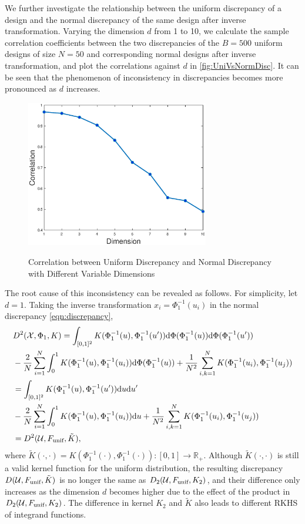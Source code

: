 \documentclass[graybox]{svmult}
\newcommand{\dif}{{\rm d}}
\newcommand{\Udes}{\mathcal{U}}
\newcommand{\Xdes}{\mathcal{X}}
\newcommand{\unif}{\textup{unif}}
\begin{document}
We further investigate the relationship between the uniform discrepancy of a design and the normal discrepancy of the same design after inverse transformation.
Varying the dimension $d$ from 1 to 10, we calculate the sample correlation coefficients between the two discrepancies of the $B=500$ uniform designs of size $N=50$ and corresponding normal designs after inverse transformation, and plot the correlations against $d$ in \ref{fig:UniVsNormDisc}. 
It can be seen that the phenomenon of inconsistency in discrepancies becomes more pronounced as $d$ increases.

\begin{figure}[ht]
\label{fig:DimVsDisc}
\centering
{\includegraphics[width=8cm]{dimVsdisc.eps}}
\caption{Correlation between Uniform Discrepancy and Normal Discrepancy with Different Variable Dimensions}
\end{figure}

The root cause of this inconsistency can be revealed as follows. 
For simplicity, let $d=1$. 
Taking the inverse transformation $x_{i}=\Phi^{-1}_1(u_{i})$ in the normal discrepancy \eqref{eqn:discrepancy}, 
\begin{align*}
&D^2(\Xdes, \Phi_1, K) = \int_{[0,1]^2} K(\Phi^{-1}_1(u),\Phi^{-1}_1(u'))\dif \Phi(\Phi^{-1}_1(u))\dif \Phi(\Phi^{-1}_1(u'))\\
&-\frac{2}{N}\sum_{i=1}^N \int_0^1 K(\Phi^{-1}_1(u),\Phi^{-1}_1(u_i))\dif \Phi(\Phi^{-1}_1(u))+\frac{1}{N^2}\sum_{i,k=1}^N K(\Phi^{-1}_1(u_i), \Phi^{-1}_1(u_j))\\
&=\int_{[0,1]^2} K(\Phi^{-1}_1(u),\Phi^{-1}_1(u'))\dif u\dif u'\\
&-\frac{2}{N}\sum_{i=1}^N \int_0^1 K(\Phi^{-1}_1(u),\Phi^{-1}_1(u_i))\dif u+\frac{1}{N^2}\sum_{i,k=1}^N K(\Phi^{-1}_1(u_i), \Phi^{-1}_1(u_j))\\
&=D^2(\Udes,F_\unif,\tilde{K}),
\end{align*}
where $\tilde{K}(\cdot,\cdot)=K(\Phi^{-1}_1(\cdot), \Phi^{-1}_1(\cdot)): [0, 1]\rightarrow \mathbb{R}_{+}$. 
Although $\tilde{K}(\cdot,\cdot)$ is still a valid kernel function for the uniform distribution, the resulting discrepancy $D(\Udes,F_\unif, \tilde{K})$ is no longer the same as $D_2(\Udes, F_\unif, K_2)$, and their difference only increases as the dimension $d$ becomes higher due to the effect of the product in $D_2(\Udes, F_\unif, K_2)$. 
The difference in kernel $K_2$ and $\tilde{K}$ also leads to different RKHS of integrand functions. 
\end{document}
